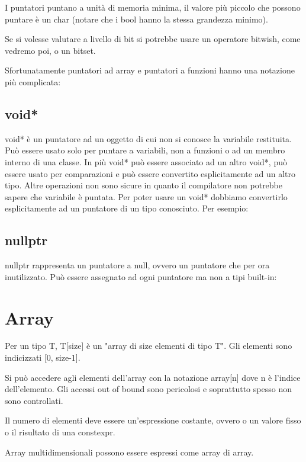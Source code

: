 \documentclass[11pt,a4paper]{book}
\begin{document}
I puntatori puntano a unità di memoria minima, il valore più piccolo che possono puntare è un char (notare che i bool hanno la stessa grandezza minimo).

Se si volesse valutare a livello di bit si potrebbe usare un operatore bitwish, come vedremo poi, o un bitset.

Sfortunatamente puntatori ad array e puntatori a funzioni hanno una notazione più complicata:
\label{code: 079}

\subsection{void*}
void* è un puntatore ad un oggetto di cui non si conosce la variabile restituita. Può essere usato solo per puntare a variabili, non a funzioni o ad un membro interno di una classe. In più void* può essere associato ad un altro void*, può essere usato per comparazioni e può essere convertito esplicitamente ad un altro tipo. Altre operazioni non sono sicure in quanto il compilatore non potrebbe sapere che variabile è puntata. Per poter usare un void* dobbiamo convertirlo esplicitamente ad un puntatore di un tipo conosciuto. Per esempio:
\label{code: 080}

\subsection{nullptr}
nullptr rappresenta un puntatore a null, ovvero un puntatore che per ora inutilizzato. Può essere assegnato ad ogni puntatore ma non a tipi built-in:
\label{code: 081}

\section{Array}
Per un tipo T, T[size] è un "array di size elementi di tipo T". Gli elementi sono indicizzati [0, size-1].

Si può accedere agli elementi dell'array con la notazione array[n] dove n è l'indice dell'elemento. Gli accessi out of bound sono pericolosi e soprattutto spesso non sono controllati.

Il numero di elementi deve essere un'espressione costante, ovvero o un valore fisso o il risultato di una constexpr.

Array multidimensionali possono essere espressi come array di array.
\end{document}
